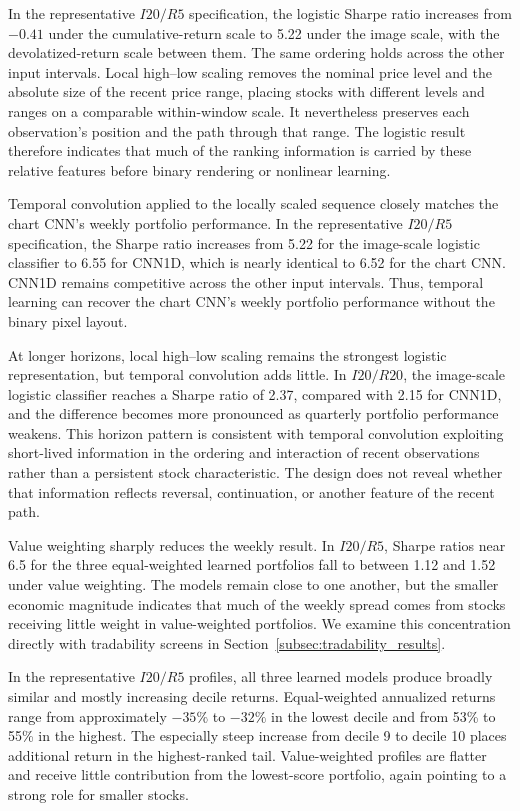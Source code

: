 In the representative $I20/R5$ specification, the logistic Sharpe ratio increases from $-0.41$ under the cumulative-return scale to 5.22 under the image scale, with the devolatized-return scale between them. The same ordering holds across the other input intervals. Local high--low scaling removes the nominal price level and the absolute size of the recent price range, placing stocks with different levels and ranges on a comparable within-window scale. It nevertheless preserves each observation's position and the path through that range. The logistic result therefore indicates that much of the ranking information is carried by these relative features before binary rendering or nonlinear learning.

Temporal convolution applied to the locally scaled sequence closely matches the chart CNN's weekly portfolio performance. In the representative $I20/R5$ specification, the Sharpe ratio increases from 5.22 for the image-scale logistic classifier to 6.55 for CNN1D, which is nearly identical to 6.52 for the chart CNN. CNN1D remains competitive across the other input intervals. Thus, temporal learning can recover the chart CNN's weekly portfolio performance without the binary pixel layout.

At longer horizons, local high--low scaling remains the strongest logistic representation, but temporal convolution adds little. In $I20/R20$, the image-scale logistic classifier reaches a Sharpe ratio of 2.37, compared with 2.15 for CNN1D, and the difference becomes more pronounced as quarterly portfolio performance weakens. This horizon pattern is consistent with temporal convolution exploiting short-lived information in the ordering and interaction of recent observations rather than a persistent stock characteristic. The design does not reveal whether that information reflects reversal, continuation, or another feature of the recent path.

Value weighting sharply reduces the weekly result. In $I20/R5$, Sharpe ratios near 6.5 for the three equal-weighted learned portfolios fall to between 1.12 and 1.52 under value weighting. The models remain close to one another, but the smaller economic magnitude indicates that much of the weekly spread comes from stocks receiving little weight in value-weighted portfolios. We examine this concentration directly with tradability screens in Section~\ref{subsec:tradability_results}.

In the representative $I20/R5$ profiles, all three learned models produce broadly similar and mostly increasing decile returns. Equal-weighted annualized returns range from approximately $-35\%$ to $-32\%$ in the lowest decile and from 53\% to 55\% in the highest. The especially steep increase from decile 9 to decile 10 places additional return in the highest-ranked tail. Value-weighted profiles are flatter and receive little contribution from the lowest-score portfolio, again pointing to a strong role for smaller stocks.


